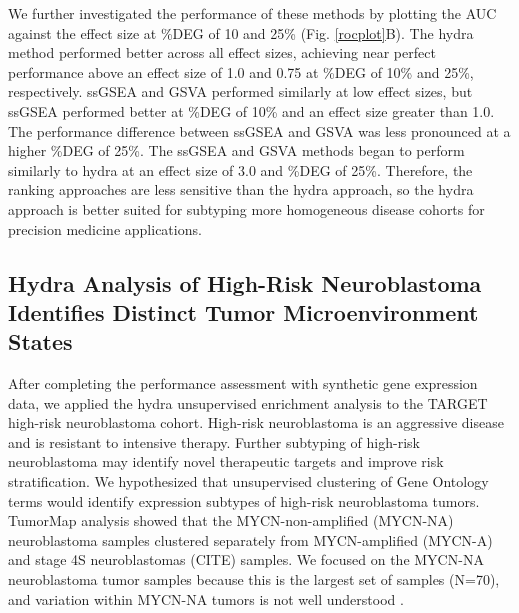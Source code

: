 \documentclass[10pt,letterpaper]{article}
\begin{document}
We further investigated the performance of these methods by plotting the AUC against the effect size at \%DEG of 10 and 25\% (Fig. \ref{rocplot}B). The hydra method performed better across all effect sizes, achieving near perfect performance above an effect size of 1.0 and 0.75 at \%DEG of 10\% and 25\%, respectively. ssGSEA and GSVA performed similarly at low effect sizes, but ssGSEA performed better at \%DEG of 10\% and an effect size greater than 1.0. The performance difference between ssGSEA and GSVA was less pronounced at a higher \%DEG of 25\%. The ssGSEA and GSVA methods began to perform similarly to hydra at an effect size of 3.0 and \%DEG of 25\%. Therefore, the ranking approaches are less sensitive than the hydra approach, so the hydra approach is better suited for subtyping more homogeneous disease cohorts for precision medicine applications.

\subsection{Hydra Analysis of High-Risk Neuroblastoma Identifies Distinct Tumor Microenvironment States}
After completing the performance assessment with synthetic gene expression data, we applied the hydra unsupervised enrichment analysis to the TARGET high-risk neuroblastoma cohort. High-risk neuroblastoma is an aggressive disease and is resistant to intensive therapy. Further subtyping of high-risk neuroblastoma may identify novel therapeutic targets and improve risk stratification. We hypothesized that unsupervised clustering of Gene Ontology terms would identify expression subtypes of high-risk neuroblastoma tumors. TumorMap analysis showed that the MYCN-non-amplified (MYCN-NA) neuroblastoma samples clustered separately from MYCN-amplified (MYCN-A) and stage 4S neuroblastomas (CITE) samples. We focused on the MYCN-NA neuroblastoma tumor samples because this is the largest set of samples (N=70), and variation within MYCN-NA tumors is not well understood \cite{morgensternChallengeDefiningUltrahighrisk2019a}.
\end{document}
